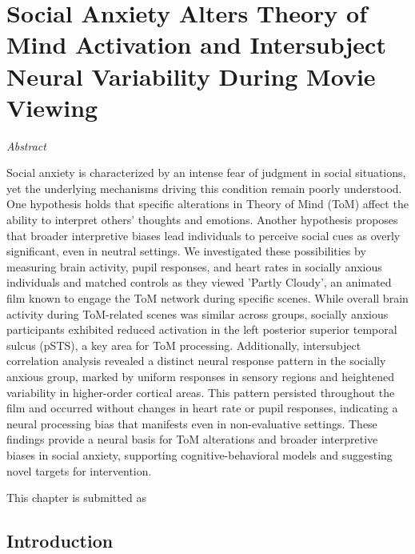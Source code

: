 \chapter{Social Anxiety Alters Theory of Mind Activation and Intersubject Neural Variability During Movie Viewing}
\label{ch:mentalizing_sa}


\vspace{-1cm}
\begin{center}
    \large\textit{Abstract}
\end{center} 

{\abstractfont 
Social anxiety is characterized by an intense fear of judgment in social situations, yet the underlying mechanisms driving this condition remain poorly understood. One hypothesis holds that specific alterations in Theory of Mind (ToM) affect the ability to interpret others' thoughts and emotions. Another hypothesis proposes that broader interpretive biases lead individuals to perceive social cues as overly significant, even in neutral settings. We investigated these possibilities by measuring brain activity, pupil responses, and heart rates in socially anxious individuals and matched controls as they viewed 'Partly Cloudy', an animated film known to engage the ToM network during specific scenes. While overall brain activity during ToM-related scenes was similar across groups, socially anxious participants exhibited reduced activation in the left posterior superior temporal sulcus (pSTS), a key area for ToM processing. Additionally, intersubject correlation analysis revealed a distinct neural response pattern in the socially anxious group, marked by uniform responses in sensory regions and heightened variability in higher-order cortical areas. This pattern persisted throughout the film and occurred without changes in heart rate or pupil responses, indicating a neural processing bias that manifests even in non-evaluative settings. These findings provide a neural basis for ToM alterations and broader interpretive biases in social anxiety, supporting cognitive-behavioral models and suggesting novel targets for intervention.
} 

\vspace{2cm}
This chapter is submitted as 

\thispagestyle{empty}

\newpage

\section*{Introduction}

